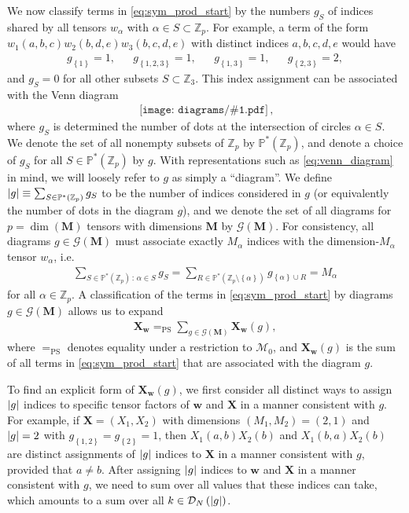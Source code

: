 \documentclass[nofootinbib,notitlepage,11pt]{revtex4-2}
\newcommand{\p}[1]{\left(#1\right)} %
\renewcommand{\set}[1]{\left\{#1\right\}} %
\newcommand{\m}{\bm} %
\newcommand{\1}{\mathds{1}}
\newcommand{\D}{\mathcal{D}}
\newcommand{\G}{\mathcal{G}}
\newcommand{\M}{\mathcal{M}}
\newcommand{\PP}{\mathbb{P}}
\newcommand{\ZZ}{\mathbb{Z}}
\newcommand{\EQPS}{=_{\text{PS}}}
\newcommand{\diagram}[1]
{\,\texttt{[image: diagrams/\#1.pdf]}\,}
\begin{document}
We now classify terms in \eqref{eq:sym_prod_start} by the numbers
$g_S$ of indices shared by all tensors $w_\alpha$ with
$\alpha\in S\subset\ZZ_p$.  For example, a term of the form
$w_1\p{a,b,c} w_2\p{b,d,e} w_3\p{b,c,d,e}$ with distinct indices
$a,b,c,d,e$ would have
\begin{align}
  g_{\set{1}} = 1,
  &&
  g_{\set{1,2,3}} = 1,
  &&
  g_{\set{1,3}} = 1,
  &&
  g_{\set{2,3}} = 2,
\end{align}
and $g_S=0$ for all other subsets $S\subset\ZZ_3$.  This index
assignment can be associated with the Venn diagram
\begin{align}
  \diagram{example_123},
  \label{eq:venn_diagram}
\end{align}
where $g_S$ is determined the number of dots at the intersection of
circles $\alpha\in S$.  We denote the set of all nonempty subsets of
$\ZZ_p$ by $\PP^*\p{\ZZ_p}$, and denote a choice of $g_S$ for all
$S\in\PP^*\p{\ZZ_p}$ by $g$.  With representations such as
\eqref{eq:venn_diagram} in mind, we will loosely refer to $g$ as
simply a ``diagram''.  We define
$\abs{g}\equiv\sum_{S\in\PP^*\p{\ZZ_p}}g_S$ to be the number of
indices considered in $g$ (or equivalently the number of dots in the
diagram $g$), and we denote the set of all diagrams for
$p=\dim\p{\m M}$ tensors with dimensions $\m M$ by $\G\p{\m M}$.  For
consistency, all diagrams $g\in\G\p{\m M}$ must associate exactly
$M_\alpha$ indices with the dimension-$M_\alpha$ tensor $w_\alpha$,
i.e.
\begin{align}
  \sum_{S\in\PP^*\p{\ZZ_p}\,:\,\alpha\in S} g_S
  = \sum_{R\in\PP^*\p{\ZZ_p\setminus\set{\alpha}}} g_{\set{\alpha}\cup R}
  = M_\alpha
\end{align}
for all $\alpha\in\ZZ_p$.  A classification of the terms in
\eqref{eq:sym_prod_start} by diagrams $g\in\G\p{\m M}$ allows us to
expand
\begin{align}
  \m X_{\m w} \EQPS \sum_{g\in\G\p{\m M}} \m X_{\m w}\p{g},
  \label{eq:sym_prod_diagrams}
\end{align}
where $\EQPS$ denotes equality under a restriction to $\M_0$, and
$\m X_{\m w}\p{g}$ is the sum of all terms in
\eqref{eq:sym_prod_start} that are associated with the diagram $g$.

To find an explicit form of $\m X_{\m w}\p{g}$, we first consider all
distinct ways to assign $\abs{g}$ indices to specific tensor factors
of $\m w$ and $\m X$ in a manner consistent with $g$.  For example, if
$\m X=\p{X_1,X_2}$ with dimensions $\p{M_1,M_2}=\p{2,1}$ and
$\abs{g}=2$ with $g_{\set{1,2}}=g_{\set{2}}=1$, then
$X_1\p{a,b} X_2\p{b}$ and $X_1\p{b,a} X_2\p{b}$ are distinct
assignments of $\abs{g}$ indices to $\m X$ in a manner consistent with
$g$, provided that $a\ne b$.  After assigning $\abs{g}$ indices to
$\m w$ and $\m X$ in a manner consistent with $g$, we need to sum over
all values that these indices can take, which amounts to a sum over
all $k\in\D_N\p{\abs{g}}$.
\end{document}
